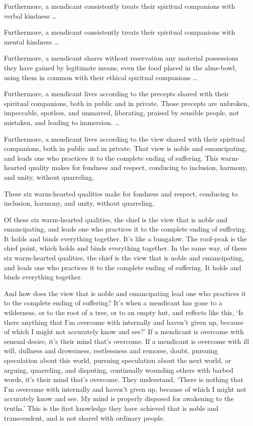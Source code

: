 \documentclass[12pt,openany]{book}%
\begin{document}
Furthermore, a mendicant consistently treats their spiritual companions with verbal kindness … 

Furthermore, a mendicant consistently treats their spiritual companions with mental kindness … 

Furthermore, a mendicant shares without reservation any material possessions they have gained by legitimate means, even the food placed in the alms-bowl, using them in common with their ethical spiritual companions … 

Furthermore, a mendicant lives according to the precepts shared with their spiritual companions, both in public and in private. Those precepts are unbroken, impeccable, spotless, and unmarred, liberating, praised by sensible people, not mistaken, and leading to immersion. … 

Furthermore, a mendicant lives according to the view shared with their spiritual companions, both in public and in private. That view is noble and emancipating, and leads one who practices it to the complete ending of suffering. This warm-hearted quality makes for fondness and respect, conducing to inclusion, harmony, and unity, without quarreling. 

These six warm-hearted qualities make for fondness and respect, conducing to inclusion, harmony, and unity, without quarreling. 

Of these six warm-hearted qualities, the chief is the view that is noble and emancipating, and leads one who practices it to the complete ending of suffering. It holds and binds everything together. It’s like a bungalow. The roof-peak is the chief point, which holds and binds everything together. In the same way, of these six warm-hearted qualities, the chief is the view that is noble and emancipating, and leads one who practices it to the complete ending of suffering. It holds and binds everything together. 

And how does the view that is noble and emancipating lead one who practices it to the complete ending of suffering? It’s when a mendicant has gone to a wilderness, or to the root of a tree, or to an empty hut, and reflects like this, ‘Is there anything that I’m overcome with internally and haven’t given up, because of which I might not accurately know and see?’ If a mendicant is overcome with sensual desire, it’s their mind that’s overcome. If a mendicant is overcome with ill will, dullness and drowsiness, restlessness and remorse, doubt, pursuing speculation about this world, pursuing speculation about the next world, or arguing, quarreling, and disputing, continually wounding others with barbed words, it’s their mind that’s overcome. They understand, ‘There is nothing that I’m overcome with internally and haven’t given up, because of which I might not accurately know and see. My mind is properly disposed for awakening to the truths.’ This is the first knowledge they have achieved that is noble and transcendent, and is not shared with ordinary people. 
\end{document}
